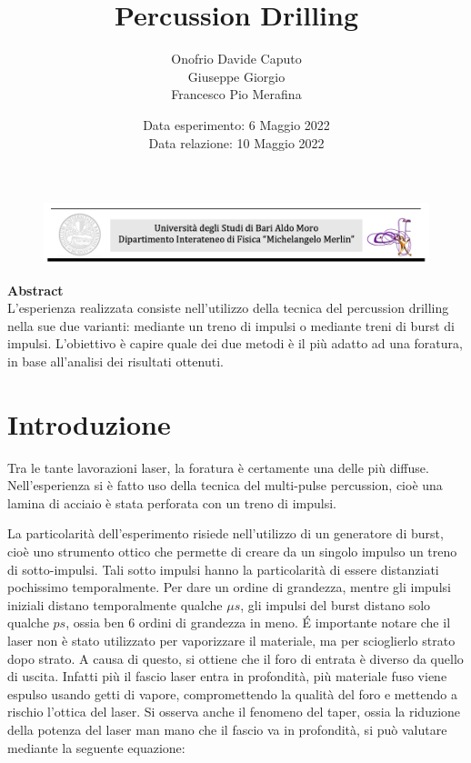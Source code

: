\documentclass{article}
\title{\huge Percussion Drilling}
\author{ \large Onofrio Davide Caputo \\ \large Giuseppe Giorgio  \\ \large Francesco Pio Merafina}
\date{ \small Data esperimento: 6 Maggio 2022 \\ Data relazione: 10 Maggio 2022}
\begin{document}
\begin{figure}[t]
\hspace*{-2cm}
    \includegraphics{Uniba.png}
\end{figure} 
\maketitle

\noindent \textbf{\Large Abstract}\\

\noindent L'esperienza realizzata consiste nell'utilizzo della tecnica del percussion drilling nella sue due varianti: mediante un treno di impulsi o mediante treni di burst di impulsi.
L'obiettivo è capire quale dei due metodi è il più adatto ad una foratura, in base all'analisi dei risultati ottenuti. 

\tableofcontents

\normalsize
\setlength{\columnsep}{20pt}
\twocolumn
\section{Introduzione}
Tra le tante lavorazioni laser, la foratura è certamente una delle più diffuse. Nell'esperienza si è fatto uso della tecnica del multi-pulse percussion, cioè una lamina di acciaio è stata perforata con un treno di impulsi. 

La particolarità dell'esperimento risiede nell'utilizzo di un generatore di burst, cioè uno strumento ottico che permette di creare da un singolo impulso un treno di sotto-impulsi. Tali sotto impulsi hanno la particolarità di essere distanziati pochissimo temporalmente. Per dare un ordine di grandezza, mentre gli impulsi iniziali distano temporalmente qualche $\mu s$, gli impulsi del burst distano solo qualche $ps$, ossia ben 6 ordini di grandezza in meno.
 É importante notare che il laser non è stato utilizzato per vaporizzare il materiale, ma per scioglierlo strato dopo strato. A causa di questo, si ottiene che il foro di entrata è diverso da quello di uscita. Infatti più il fascio laser entra in profondità, più materiale fuso viene espulso usando getti di vapore, compromettendo la qualità del foro e mettendo a rischio l'ottica del laser. 
 Si osserva anche il fenomeno del taper, ossia la riduzione della potenza del laser man mano che il fascio va in profondità, si può valutare mediante la seguente equazione:
\end{document}
